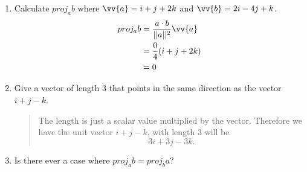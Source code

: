 \documentclass{hw}
\begin{document}
\begin{enumerate}
\item Calculate $proj_{a}b$ where $\vv{a} = i + j + 2k$ and $\vv{b} = 2i - 4j + k$.
\begin{align*}
proj_{a}b &= {a\cdot b \over ||a||^{2}}\vv{a}\\
&= {0\over 4}(i+j+2k)\\
&= 0
\end{align*}

\item Give a vector of length 3 that points in the same direction as the vector $i + j - k$.
\begin{quote}
The length is just a scalar value multiplied by the vector. Therefore we have the unit vector $i + j - k$,
with length 3 will be
\[3i + 3j - 3k.\]
\end{quote}

\item Is there ever a case where $proj_{a}b = proj_{b}a$?
\begin{quote}

\end{quote}
\end{enumerate}
\end{document}

